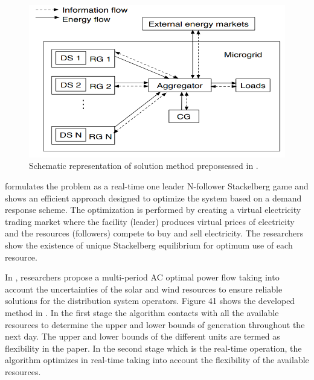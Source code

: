 \begin{figure}[!h]
\centering
\includegraphics[width=0.85\linewidth]{figs/RT_2.png}
\caption[Schematic representation of solution method prepossessed]{Schematic representation of solution method prepossessed in \cite{Sun14}.}
\label{fig:RT_2}
\end{figure}

\cite{Men16} formulates the problem as a real-time one leader N-follower Stackelberg game and shows an efficient approach designed to optimize the system based on a demand response scheme. The optimization is performed by creating a virtual electricity trading market where the facility (leader) produces virtual prices of electricity and the resources (followers) compete to buy and sell electricity. The researchers show the existence of unique Stackelberg equilibrium for optimum use of each resource.

In \cite{Tia17}, researchers propose a multi-period AC optimal power flow taking into account the uncertainties of the solar and wind resources to ensure reliable solutions for the distribution system operators. Figure 41 shows the developed method in \cite{Tia17}. In the first stage the algorithm contacts with all the available resources to determine the upper and lower bounds of generation throughout the next day. The upper and lower bounds of the different units are termed as flexibility in the paper. In the second stage which is the real-time operation, the algorithm optimizes in real-time taking into account the flexibility of the available resources. 
 
